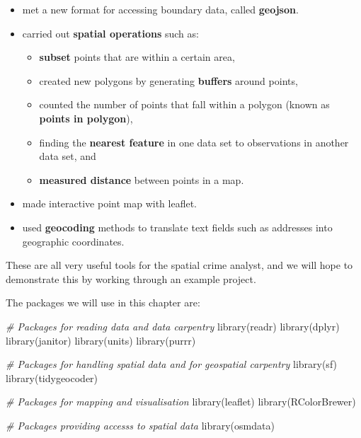 \documentclass[
]{book}
\newenvironment{Shaded}{\begin{snugshade}}{\end{snugshade}}
\newcommand{\CommentTok}[1]{\textcolor[rgb]{0.56,0.35,0.01}{\textit{#1}}}
\newcommand{\FunctionTok}[1]{\textcolor[rgb]{0.00,0.00,0.00}{#1}}
\newcommand{\NormalTok}[1]{#1}
\providecommand{\tightlist}{%
  \setlength{\itemsep}{0pt}\setlength{\parskip}{0pt}}
\begin{document}
\begin{itemize}
\tightlist
\item
  met a new format for accessing boundary data, called \textbf{geojson}.
\item
  carried out \textbf{spatial operations} such as:

  \begin{itemize}
  \tightlist
  \item
    \textbf{subset} points that are within a certain area,
  \item
    created new polygons by generating \textbf{buffers} around points,
  \item
    counted the number of points that fall within a polygon (known as \textbf{points in polygon}),
  \item
    finding the \textbf{nearest feature} in one data set to observations in another data set, and
  \item
    \textbf{measured distance} between points in a map.
  \end{itemize}
\item
  made interactive point map with leaflet.
\item
  used \textbf{geocoding} methods to translate text fields such as addresses into geographic coordinates.
\end{itemize}

These are all very useful tools for the spatial crime analyst, and we will hope to demonstrate this by working through an example project.

The packages we will use in this chapter are:

\begin{Shaded}
\begin{Highlighting}[]
\CommentTok{\# Packages for reading data and data carpentry}
\FunctionTok{library}\NormalTok{(readr)}
\FunctionTok{library}\NormalTok{(dplyr)}
\FunctionTok{library}\NormalTok{(janitor)}
\FunctionTok{library}\NormalTok{(units)}
\FunctionTok{library}\NormalTok{(purrr)}

\CommentTok{\# Packages for handling spatial data and for geospatial carpentry}
\FunctionTok{library}\NormalTok{(sf)}
\FunctionTok{library}\NormalTok{(tidygeocoder)}

\CommentTok{\# Packages for mapping and visualisation}
\FunctionTok{library}\NormalTok{(leaflet)}
\FunctionTok{library}\NormalTok{(RColorBrewer)}

\CommentTok{\# Packages providing accesss to spatial data}
\FunctionTok{library}\NormalTok{(osmdata)}
\end{Highlighting}
\end{Shaded}
\end{document}
